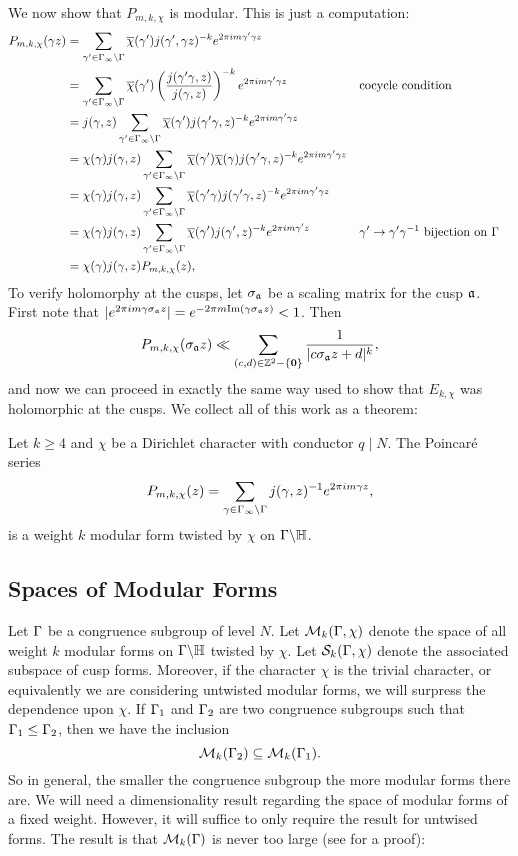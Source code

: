       We now show that $P_{m,k,\chi}$ is modular. This is just a computation:
      \begin{align*}
        P_{m,k,\chi}(\gamma z) &= \sum_{\gamma' \in \Gamma_{\infty}\backslash\Gamma}\overline{\chi}(\gamma')j(\gamma',\gamma z)^{-k}e^{2\pi im\gamma'\gamma z} \\
        &= \sum_{\gamma' \in \Gamma_{\infty}\backslash\Gamma}\overline{\chi}(\gamma')\left(\frac{j(\gamma'\gamma,z)}{j(\gamma,z)}\right)^{-k}e^{2\pi im\gamma'\gamma z} && \text{cocycle condition} \\
        &= j(\gamma,z)\sum_{\gamma' \in \Gamma_{\infty}\backslash\Gamma}\overline{\chi}(\gamma')j(\gamma'\gamma,z)^{-k}e^{2\pi im\gamma'\gamma z} \\
        &= \chi(\gamma)j(\gamma,z)\sum_{\gamma' \in \Gamma_{\infty}\backslash\Gamma}\overline{\chi}(\gamma')\overline{\chi}(\gamma)j(\gamma'\gamma,z)^{-k}e^{2\pi im\gamma'\gamma z} \\
        &= \chi(\gamma)j(\gamma,z)\sum_{\gamma' \in \Gamma_{\infty}\backslash\Gamma}\overline{\chi}(\gamma'\gamma)j(\gamma'\gamma,z)^{-k}e^{2\pi im\gamma'\gamma z} \\
        &= \chi(\gamma)j(\gamma,z)\sum_{\gamma' \in \Gamma_{\infty}\backslash\Gamma}\overline{\chi}(\gamma')j(\gamma',z)^{-k}e^{2\pi im\gamma'z} && \text{$\gamma' \to \gamma'\gamma^{-1}$ bijection on $\Gamma$} \\
        &= \chi(\gamma)j(\gamma,z)P_{m,k,\chi}(z),
      \end{align*}
      To verify holomorphy at the cusps, let $\sigma_{\mathfrak{a}}$ be a scaling matrix for the cusp $\mathfrak{a}$. First note that $|e^{2\pi im\gamma\sigma_{\mathfrak{a}}z}| = e^{-2\pi m\mathrm{Im}(\gamma\sigma_{\mathfrak{a}}z)} < 1$. Then
      \[
        P_{m,k,\chi}(\sigma_{\mathfrak{a}}z) \ll \sum_{(c,d) \in \mathbb{Z}^{2}-\{\mathbf{0}\}}\frac{1}{|c\sigma_{\mathfrak{a}}z+d|^{k}},
      \]
      and now we can proceed in exactly the same way used to show that $E_{k,\chi}$ was holomorphic at the cusps. We collect all of this work as a theorem:

      \begin{theorem}
        Let $k \ge 4$ and $\chi$ be a Dirichlet character with conductor $q \mid N$. The Poincar\'e series
        \[
          P_{m,k,\chi}(z) = \sum_{\gamma \in \Gamma_{\infty}\backslash\Gamma}j(\gamma,z)^{-1}e^{2\pi im\gamma z},
        \]
        is a weight $k$ modular form twisted by $\chi$ on $\Gamma\backslash\mathbb{H}$.
      \end{theorem}
    \subsection*{Spaces of Modular Forms}
      Let $\Gamma$ be a congruence subgroup of level $N$. Let $\mathcal{M}_{k}(\Gamma,\chi)$ denote the space of all weight $k$ modular forms on $\Gamma\backslash\mathbb{H}$ twisted by $\chi$. Let $\mathcal{S}_{k}(\Gamma,\chi)$ denote the associated subspace of cusp forms. Moreover, if the character $\chi$ is the trivial character, or equivalently we are considering untwisted modular forms, we will surpress the dependence upon $\chi$. If $\Gamma_{1}$ and $\Gamma_{2}$ are two congruence subgroups such that $\Gamma_{1} \le \Gamma_{2}$, then we have the inclusion
      \[
        \mathcal{M}_{k}(\Gamma_{2}) \subseteq \mathcal{M}_{k}(\Gamma_{1}).
      \]
      So in general, the smaller the congruence subgroup the more modular forms there are. We will need a dimensionality result regarding the space of modular forms of a fixed weight. However, it will suffice to only require the result for untwised forms. The result is that $\mathcal{M}_{k}(\Gamma)$ is never too large (see \cite{diamond2005first} for a proof):

